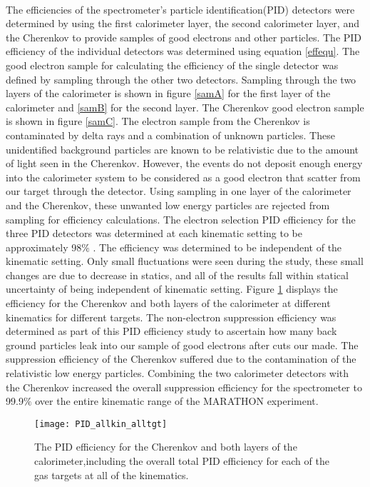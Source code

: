 \paragraph{}The efficiencies of the spectrometer's particle identification(PID) detectors were determined by using the first calorimeter layer, the second calorimeter layer, and the Cherenkov to provide samples of good electrons and other particles. The PID efficiency of the individual detectors was determined using equation \ref{effequ}. The good electron sample for calculating the efficiency of the single detector was defined by sampling through the other two detectors. Sampling through the two layers of the calorimeter is shown in figure \ref{samA} for the first layer of the calorimeter and \ref{samB} for the second layer. The Cherenkov good electron sample is shown in figure \ref{samC}. The electron sample from the Cherenkov is contaminated by delta rays and a combination of unknown particles. These unidentified background particles are known to be relativistic due to the amount of light seen in the Cherenkov. However, the events do not deposit enough energy into the calorimeter system to be considered as a good electron that scatter from our target through the detector. Using sampling in one layer of the calorimeter and the Cherenkov, these unwanted low energy particles are rejected from sampling for efficiency calculations. The electron selection PID efficiency for the three PID detectors was determined at each kinematic setting to be approximately 98$\%$ . The efficiency was determined to be independent of the kinematic setting. Only small fluctuations were seen during the study, these small changes are due to decrease in statics, and all of the results fall within statical uncertainty of being independent of kinematic setting. Figure \ref{PID_eff} displays the efficiency for the Cherenkov and both layers of the calorimeter at different kinematics for different targets. The non-electron suppression efficiency was determined as part of this PID efficiency study to ascertain how many back ground particles leak into our sample of good electrons after cuts our made. The suppression efficiency of the Cherenkov suffered due to the contamination of the relativistic low energy particles. Combining the two calorimeter detectors with the Cherenkov increased the overall suppression efficiency for the spectrometer to 99.9$\%$ over the entire kinematic range of the MARATHON experiment. 

\begin{figure}[t!]

	\centering
	\texttt{[image: PID\_allkin\_alltgt]}
	
	\caption{The PID efficiency for the Cherenkov and both layers of the calorimeter,including the overall total PID efficiency for each of the gas targets at all of the kinematics.\label{PID_eff}}
\end{figure}

